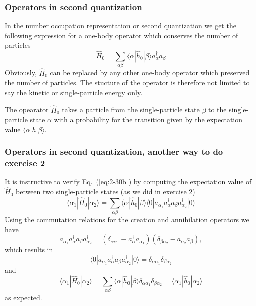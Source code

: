 \documentclass[compress]{beamer}
\newcommand*{\ket}[1]{|#1\rangle}
\newcommand*{\bra}[1]{\langle#1|}
\newcommand{\element}[3]
        {\bra{#1}#2\ket{#3}}
\begin{document}
\frame
{
  \frametitle{Operators in second quantization}
\begin{small}
{\scriptsize
In the number occupation representation or second quantization we get the following expression for a one-body 
operator which conserves the number of particles
\begin{equation}
	\hat{H}_0 = \sum_{\alpha\beta} \element{\alpha}{\hat{h}_0}{\beta} a_\alpha^\dagger a_\beta \label{eq:2-30b}
\end{equation}
Obviously, $\hat{H}_0$ can be replaced by any other one-body  operator which preserved the number
of particles. The stucture of the operator is therefore not limited to say the kinetic or single-particle energy only.

The opearator $\hat{H}_0$ takes a particle from the single-particle state $\beta$  to the single-particle state $\alpha$ 
with a probability for the transition given by the expectation value $\element{\alpha}{h}{\beta}$.
}
\end{small}
}

\frame
{
  \frametitle{Operators in second quantization, another way to do exercise 2}
\begin{small}
{\scriptsize
It is instructive to verify Eq.~(\ref{eq:2-30b}) by computing the expectation value of $\hat{H}_0$ 
between two single-particle states (as we did in exercise 2)
\begin{equation}
	\element{\alpha_1}{\hat{H}_0}{\alpha_2} = \sum_{\alpha\beta} \element{\alpha}{\hat{h}_0}{\beta} 
		\element{0}{a_{\alpha_1}a_\alpha^\dagger a_\beta a_{\alpha_2}^\dagger}{0} \label{eq:2-30c}
\end{equation}
Using the commutation relations for the creation and annihilation operators we have 
\begin{equation}
	a_{\alpha_1}a_\alpha^\dagger a_\beta a_{\alpha_2}^\dagger = (\delta_{\alpha \alpha_1} - a_\alpha^\dagger a_{\alpha_1} )
		(\delta_{\beta \alpha_2} - a_{\alpha_2}^\dagger a_{\beta} ), \label{eq:2-30d}
\end{equation}
which results in
\begin{equation}
	\element{0}{a_{\alpha_1}a_\alpha^\dagger a_\beta a_{\alpha_2}^\dagger}{0} = 
		\delta_{\alpha \alpha_1} \delta_{\beta \alpha_2} \label{eq:2-30e}
\end{equation}
and
\begin{equation}
	\element{\alpha_1}{\hat{H}_0}{\alpha_2} = \sum_{\alpha\beta} \element{\alpha}{\hat{h}_0}{\beta} 
		\delta_{\alpha \alpha_1} \delta_{\beta \alpha_2} = \element{\alpha_1}{\hat{h}_0}{\alpha_2} \label{eq:2-30f}
\end{equation}
as expected.
}
\end{small}
}
\end{document}
